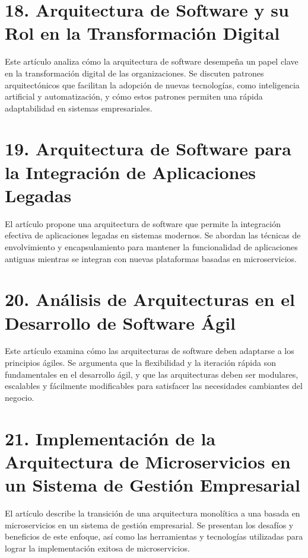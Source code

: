 \documentclass[twocolumn]{article}
\begin{document}
\printbibliography[heading=subbibliography]

\section*{18. Arquitectura de Software y su Rol en la Transformación Digital}
Este artículo analiza cómo la arquitectura de software desempeña un papel clave en la transformación digital de las organizaciones. Se discuten patrones arquitectónicos que facilitan la adopción de nuevas tecnologías, como inteligencia artificial y automatización, y cómo estos patrones permiten una rápida adaptabilidad en sistemas empresariales.



\printbibliography[heading=subbibliography]

\section*{19. Arquitectura de Software para la Integración de Aplicaciones Legadas}
El artículo propone una arquitectura de software que permite la integración efectiva de aplicaciones legadas en sistemas modernos. Se abordan las técnicas de envolvimiento y encapsulamiento para mantener la funcionalidad de aplicaciones antiguas mientras se integran con nuevas plataformas basadas en microservicios.



\printbibliography[heading=subbibliography]

\section*{20. Análisis de Arquitecturas en el Desarrollo de Software Ágil}
Este artículo examina cómo las arquitecturas de software deben adaptarse a los principios ágiles. Se argumenta que la flexibilidad y la iteración rápida son fundamentales en el desarrollo ágil, y que las arquitecturas deben ser modulares, escalables y fácilmente modificables para satisfacer las necesidades cambiantes del negocio.



\printbibliography[heading=subbibliography]

\section*{21. Implementación de la Arquitectura de Microservicios en un Sistema de Gestión Empresarial}
El artículo describe la transición de una arquitectura monolítica a una basada en microservicios en un sistema de gestión empresarial. Se presentan los desafíos y beneficios de este enfoque, así como las herramientas y tecnologías utilizadas para lograr la implementación exitosa de microservicios.
\end{document}
